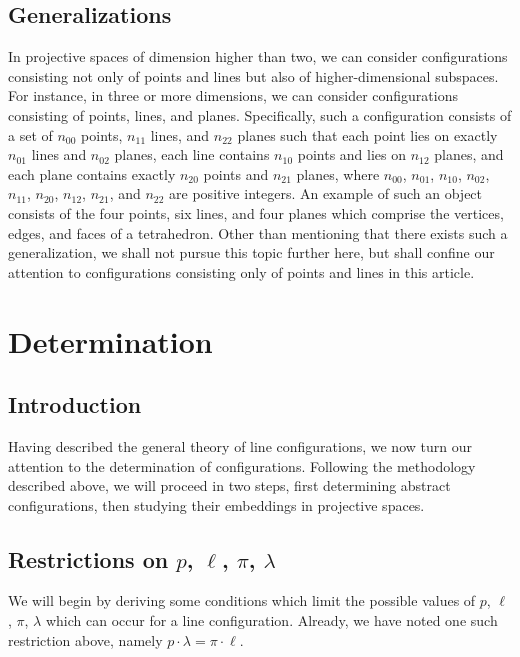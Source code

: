 \documentclass[12pt]{article}
\begin{document}
\subsection{Generalizations}

In projective spaces of dimension higher than two, we can consider
configurations consisting not only of points and lines but also of
higher-dimensional subspaces.  For instance, in three or more 
dimensions, we can consider configurations consisting of points, 
lines, and planes.  Specifically, such a configuration consists of
a set of $n_{00}$ points, $n_{11}$ lines, and $n_{22}$ planes such
that each point lies on exactly $n_{01}$ lines and $n_{02}$ planes,
each line contains $n_{10}$ points and lies on $n_{12}$ planes, and
each plane contains exactly $n_{20}$ points and $n_{21}$ planes,
where $n_{00}$, $n_{01}$, $n_{10}$, $n_{02}$, $n_{11}$, $n_{20}$,
$n_{12}$, $n_{21}$, and $n_{22}$ are positive integers.  An 
example of such an object consists of the four points, six lines,
and four planes which comprise the vertices, edges, and faces of
a tetrahedron.  Other than mentioning that there exists such a
generalization, we shall not pursue this topic further here, but
shall confine our attention to configurations consisting only of
points and lines in this article.
 
\section{Determination}

\subsection{Introduction}

Having described the general theory of line configurations, we now
turn our attention to the determination of configurations.  Following
the methodology described above, we will proceed in two steps, first
determining abstract configurations, then studying their embeddings 
in projective spaces.

\subsection{Restrictions on $p$, $\ell$, $\pi$, $\lambda$}

We will begin by deriving some conditions which limit the possible
values of $p$, $\ell$, $\pi$, $\lambda$ which can occur for a
line configuration.  Already, we have noted one such restriction
above, namely $p \cdot \lambda = \pi \cdot \ell$.
\end{document}
